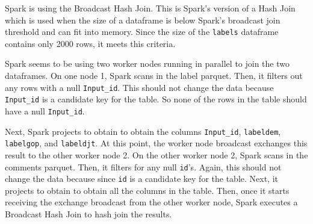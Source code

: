 \documentclass[12pt]{article}
\begin{document}
Spark is using the Broadcast Hash Join. This is Spark's version of a Hash Join which is used when the size of a
dataframe is below Spark's broadcast join threshold and can fit into memory. Since the size of the \texttt{labels}
dataframe contains only 2000 rows, it meets this criteria.

Spark seems to be using two worker nodes running in parallel to join the two dataframes. On one node 1,
Spark scans in the label parquet. Then, it filters out any rows with a null \texttt{Input\_id}. This should not change
the data because \texttt{Input\_id} is a candidate key for the table. So none of the rows in the table should
have a null \texttt{Input\_id}.

Next, Spark projects to obtain to obtain the columns \texttt{Input\_id}, \texttt{labeldem},
\texttt{labelgop}, and \texttt{labeldjt}. At this point, the worker node broadcast exchanges this result
to the other worker node 2. On the other worker node 2, Spark scans in the comments parquet. Then, it
filters for any null \texttt{id}'s. Again, this should not change the data because since \texttt{id} is a candidate key
for the table. Next, it projects to obtain to obtain all the columns in the table. Then, once it starts
receiving the exchange broadcast from the other worker node, Spark executes a Broadcast Hash Join to hash
join the results.
\end{document}
